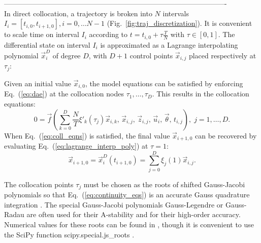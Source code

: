 \documentclass[a4paper,12pt]{article}
\newcommand{\myl}{\xi}
\newcommand{\myldot}{\myl'}
\newcommand{\refeq}[1]{Eq.~(\ref{#1})}
\newcommand{\reffig}[1]{Fig.~\ref{#1}}
\begin{document}
---------------------------------------------------------------------------------------------- \\
In direct collocation, a trajectory is broken into $N$ intervals $I_i = [t_{i,0},t_{i+1,0}], i=0,\dots N-1$ (\reffig{fig:traj_discretization}).
It is convenient to scale time on interval $I_i$ according to $t = t_{i,0} + \tau \frac{T}{N}$ with $\tau\in[0,1]$.
The differential state on interval $I_i$ is approximated as a Lagrange interpolating polynomial $\vec{x}_i^D$ of degree $D$, with $D+1$ control points $\vec{x}_{i,j}$ placed respectively at $\tau_j$:

Given an initial value $\vec{x}_{i,0}$, the model equations can be satisfied by enforcing \refeq{eq:dae} at the collocation nodes $\tau_1,\dots,\tau_D$.
This results in the collocation equations:
\begin{equation}
0 = \vec{f}\left(\sum_{k=0}^D \frac{N}{T}\myldot_k(\tau_j) \vec{x}_{i,k}, \,\vec{x}_{i,j}, \,\vec{z}_{i,j}, \,\vec{u}_i, \,\vec{\theta}, \,t_{i,j}\right), \; j = 1, \ldots, D.%
\label{eq:coll_eqns}
\end{equation}
When \refeq{eq:coll_eqns} is satisfied, the final value $\vec{x}_{i+1,0}$ can be recovered by evaluating \refeq{eq:lagrange_interp_poly} at $\tau=1$:
\begin{equation}
\vec{x}_{i+1,0} = \vec{x}_i^D(t_{i+1,0}) = \sum_{j=0}^D \myl_j(1) \vec{x}_{i,j}.
\label{eq:continuity_eqs}
\end{equation}

The collocation points $\tau_j$ must be chosen as the roots of shifted Gauss-Jacobi polynomials so that \refeq{eq:continuity_eqs} is an accurate Gauss quadrature integration \cite{Biegler2010}.%
The special Gauss-Jacobi polynomials Gauss-Legendre or Gauss-Radau are often used for their A-stability and for their high-order accuracy.
Numerical values for these roots can be found in \cite{Biegler2010}, though it is convenient to use the SciPy function scipy.special.js\_roots \cite{Scipy2001}.
\end{document}
